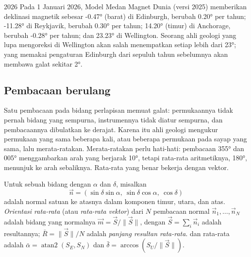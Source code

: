 \begin{dated}{2026}
Pada 1 Januari 2026, Model Medan Magnet Dunia (versi 2025) memberikan deklinasi magnetik sebesar \ang{-0.47} (barat) di Edinburgh, berubah \ang{+0.20} per tahun; \ang{-11.28} di Reykjavik, berubah \ang{+0.30} per tahun; \ang{+14.20} (timur) di Anchorage, berubah \ang{-0.28} per tahun; dan \ang{+23.23} di Wellington. Seorang ahli geologi yang lupa mengoreksi di Wellington akan salah menempatkan setiap  lebih dari \ang{23}; yang memakai pengaturan Edinburgh dari sepuluh tahun sebelumnya akan membawa galat sekitar \ang{2}.
\end{dated}

\subsection{Pembacaan berulang}

Satu pembacaan pada bidang perlapisan memuat galat: permukaannya tidak pernah bidang yang sempurna, instrumennya tidak diatur sempurna, dan pembacaannya dibulatkan ke derajat. Karena itu ahli geologi mengukur permukaan yang sama beberapa kali, atau beberapa permukaan pada sayap yang sama, lalu merata-ratakan. Merata-ratakan  perlu hati-hati: pembacaan \ang{355} dan \ang{005} menggambarkan arah yang berjarak \ang{10}, tetapi rata-rata aritmetiknya, \ang{180}, menunjuk ke arah sebaliknya. Rata-rata yang benar bekerja dengan vektor.

\begin{definition}\label{def:b1:field-lab-methods-1:mean-orientation}
Untuk sebuah bidang dengan  $\alpha$ dan  $\delta$, misalkan
\[
  \vec n = (\sin\delta\sin\alpha,\ \sin\delta\cos\alpha,\ \cos\delta)
\]
adalah normal satuan ke atasnya dalam komponen timur, utara, dan atas. \emph{Orientasi rata-rata} (atau \emph{rata-rata vektor}) dari $N$ pembacaan normal $\vec n_1, \dots, \vec n_N$ adalah bidang yang normalnya $\vec m = \vec S/\|\vec S\|$, dengan $\vec S = \sum_i \vec n_i$ adalah resultannya; $\bar R = \|\vec S\|/N$ adalah \emph{panjang resultan rata-rata}.  dan  rata-rata adalah $\bar\alpha = \operatorname{atan2}(S_E, S_N)$ dan $\bar\delta = \arccos(S_U/\|\vec S\|)$.
\end{definition}

